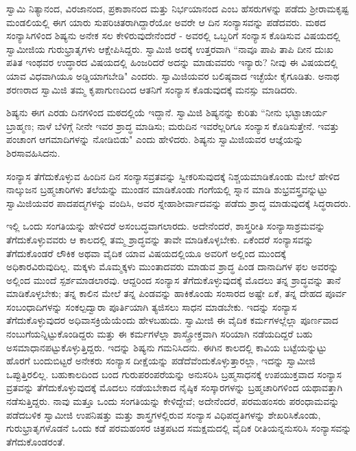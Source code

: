 ಸ್ವಾಮಿ ನಿತ್ಯಾನಂದ, ವಿರಜಾನಂದ, ಪ್ರಕಾಶಾನಂದ ಮತ್ತು ನಿರ್ಭಯಾನಂದ ಎಂಬ ಹೆಸರುಗಳನ್ನು ಪಡೆದು ಶ‍್ರೀರಾಮಕೃಷ್ಟ ಮಂಡಲಿಯಲ್ಲಿ ಈಗ ಯಾರು ಸುಪರಿಚಿತರಾಗಿದ್ದಾರೆಯೋ ಅವರೇ ಆ ದಿನ ಸಂನ್ಯಾಸವನ್ನು ಪಡೆದವರು. ಮಠದ ಸಂನ್ಯಾಸಿಗಳಿಂದ ಶಿಷ್ಯನು ಅನೇಕ ಸಲ ಕೇಳಿರುವುದೇನೆಂದರೆ - ಅವರಲ್ಲಿ ಒಬ್ಬರಿಗೆ ಸಂನ್ಯಾಸ ಕೊಡಿಸುವ ವಿಷಯದಲ್ಲಿ ಸ್ವಾಮೀಜಿಯ ಗುರುಭ್ರಾತೃಗಳು ಆಕ್ಷೇಪಿಸಿದ್ದರು. ಸ್ವಾಮಿಜಿ ಅದಕ್ಕೆ ಉತ್ತರವಾಗಿ “ನಾವೂ ಪಾಪಿ ತಾಪಿ ದೀನ ದುಃಖ ಪತಿತ ಇಂಥವರ ಉದ್ಧಾರದ ವಿಷಯದಲ್ಲಿ ಹಿಂಜರಿದರೆ ಅದನ್ನು ಮಾಡುವವರು ಇನ್ಯಾರು? ನೀವು ಈ ವಿಷಯದಲ್ಲಿ ಯಾವ ವಿಧವಾಗಿಯೂ ಅಡ್ಡಿಯಾಗಬೇಡಿ" ಎಂದರು. ಸ್ವಾಮಿಜಿಯವರ ಬಲಿಷ್ಠವಾದ ಇಚ್ಛೆಯೇ ಕೈಗೂಡಿತು. ಅನಾಥ ಶರಣರಾದ ಸ್ವಾಮಿಜಿ ತಮ್ಮ ಕೃಪಾಗುಣದಿಂದ ಆತನಿಗೆ ಸಂನ್ಯಾಸ ಕೊಡುವುದಕ್ಕೆ ಮನಸ್ಸು ಮಾಡಿದರು.

ಶಿಷ್ಯನು ಈಗ ಎರಡು ದಿನಗಳಿಂದ ಮಠದಲ್ಲಿಯೆ ಇದ್ದಾನೆ. ಸ್ವಾಮಿಜಿ ಶಿಷ್ಯನನ್ನು ಕುರಿತು “ನೀನು ಭಟ್ಟಾಚಾರ್ಯ ಬ್ರಾಹ್ಮಣ; ನಾಳೆ ಬೆಳಿಗ್ಗೆ ನೀನೇ ಇವರ ಶ್ರಾದ್ಧ ಮಾಡಿಸು; ಮರುದಿನ ಇವರೆಲ್ಲರಿಗೂ ಸಂನ್ಯಾಸ ಕೊಡಿಸುತ್ತೇನೆ. ಇವತ್ತು ಪಂಚಾಂಗ ಆಗಮಾದಿಗಳನ್ನು ನೋಡಿಬಿಡು" ಎಂದು ಹೇಳಿದರು. ಶಿಷ್ಯನು ಸ್ವಾಮಿಜಿಯವರ ಆಜ್ಞೆಯನ್ನು ಶಿರಸಾವಹಿಸಿದನು.

ಸಂನ್ಯಾಸ ತೆಗೆದುಕೊಳ್ಳುವ ಹಿಂದಿನ ದಿನ ಸಂನ್ಯಾಸವ್ರತವನ್ನು ಸ್ವೀಕರಿಸುವುದಕ್ಕೆ ನಿಶ್ಚಯಮಾಡಿಕೊಂಡು ಮೇಲೆ ಹೇಳಿದ ನಾಲ್ಕುಜನ ಬ್ರಹ್ಮಚಾರಿಗಳು ತಲೆಯನ್ನು ಮುಂಡನ ಮಾಡಿಕೊಂಡು ಗಂಗೆಯಲ್ಲಿ ಸ್ನಾನ ಮಾಡಿ ಶುಭ್ರವಸ್ತ್ರವನ್ನುಟ್ಟು ಸ್ವಾಮಿಜಿಯವರ ಪಾದಪದ್ಮಗಳನ್ನು ವಂದಿಸಿ, ಅವರ ಸ್ನೇಹಾಶೀರ್ವಾದವನ್ನು ಪಡೆದು ಶ್ರಾದ್ಧ ಮಾಡುವುದಕ್ಕೆ ಸಿದ್ಧರಾದರು.

ಇಲ್ಲಿ ಒಂದು ಸಂಗತಿಯನ್ನು ಹೇಳಿದರೆ ಅಸಂಬದ್ಧವಾಗಲಾರದು. ಅದೇನೆಂದರೆ, ಶಾಸ್ತ್ರರೀತಿ ಸಂನ್ಯಾಸಾಶ್ರಮವನ್ನು ತೆಗೆದುಕೊಳ್ಳುವವರು ಆ ಕಾಲದಲ್ಲಿ ತಮ್ಮ ಶ್ರಾದ್ಧವನ್ನು ತಾವೇ ಮಾಡಿಕೊಳ್ಳಬೇಕು. ಏಕೆಂದರೆ ಸಂನ್ಯಾಸವನ್ನು ತೆಗೆದುಕೊಂಡರೆ ಲೌಕಿಕ ಅಥವಾ ವೈದಿಕ ಯಾವ ವಿಷಯದಲ್ಲಿಯೂ ಅವರಿಗೆ ಅಲ್ಲಿಂದ ಮುಂದಕ್ಕೆ ಅಧಿಕಾರವಿರುವುದಿಲ್ಲ. ಮಕ್ಕಳು ಮೊಮ್ಮಕ್ಕಳು ಮುಂತಾದವರು ಮಾಡುವ ಶ್ರಾದ್ಧ ಪಿಂಡ ದಾನಾದಿಗಳ ಫಲ ಅವರನ್ನು ಅಲ್ಲಿಂದ ಮುಂದೆ ಸ್ಪರ್ಶಮಾಡಲಾರವು. ಆದ್ದರಿಂದ ಸಂನ್ಯಾಸ ತೆಗೆದುಕೊಳ್ಳುವುದಕ್ಕೆ ಮೊದಲು ತನ್ನ ಶ್ರಾದ್ಧವನ್ನು ತಾನೆ ಮಾಡಿಕೊಳ್ಳಬೇಕು; ತನ್ನ ಕಾಲಿನ ಮೇಲೆ ತನ್ನ ಪಿಂಡವನ್ನು ಹಾಕಿಕೊಂಡು ಸಂಸಾರದ ಅಷ್ಟೇ ಏಕೆ, ತನ್ನ ದೇಹದ ಪೂರ್ವ ಸಂಬಂಧಾದಿಗಳನ್ನು ಸಂಕಲ್ಪದ್ವಾರಾ ಪೂರ್ತಿಯಾಗಿ ತ್ಯಜಿಸಲು ಸಾಧನ ಮಾಡಬೇಕು. ಇದನ್ನು ಸಂನ್ಯಾಸ ತೆಗೆದುಕೊಳ್ಳುವುದರ ಅಧಿವಾಸಕ್ರಿಯೆಯೆಂದು ಹೇಳಬಹುದು. ಸ್ವಾಮೀಜಿ ಈ ವೈದಿಕ ಕರ್ಮಗಳಲ್ಲೆಲ್ಲಾ ಪೂರ್ಣವಾದ ನಂಬುಗೆಯನ್ನಿಟ್ಟುಕೊಂಡಿದ್ದರು ಮತ್ತು ಈ ಕರ್ಮಗಳೆಲ್ಲಾ ಶಾಸ್ತ್ರೋಕ್ತವಾಗಿ ಸರಿಯಾಗಿ ನಡೆಯದಿದ್ದರೆ ಬಹು ಅಸಮಾಧಾನಪಟ್ಟುಕೊಳ್ಳುತ್ತಿದ್ದರು. ಇದನ್ನು ಶಿಷ್ಯನು ಗಮನಿಸಿದನು. ಈಗಿನ ಕಾಲದಲ್ಲಿ ಕಾವಿಯ ಬಟ್ಟೆಯನ್ನುಟ್ಟು ಹೊರಗೆ ಬಂದುಬಿಟ್ಟರೆ ಅನೇಕರು ಸಂನ್ಯಾಸ ದೀಕ್ಷೆಯನ್ನು ಪಡೆದೆವೆಂದುಕೊಳ್ಳುತ್ತಾರಲ್ಲಾ, ಇದನ್ನು ಸ್ವಾಮೀಜಿ ಒಪ್ಪುತ್ತಿರಲಿಲ್ಲ. ಬಹುಕಾಲದಿಂದ ಬಂದ ಗುರುಪರಂಪರೆಯನ್ನು ಅನುಸರಿಸಿ ಬ್ರಹ್ಮಸಾಧನಕ್ಕೆ ಉಪಯುಕ್ತವಾದ ಸಂನ್ಯಾಸ ವ್ರತವನ್ನು ತೆಗೆದುಕೊಳ್ಳುವುದಕ್ಕೆ ಮೊದಲು ನಡೆಯಬೇಕಾದ ನೈಷ್ಠಿಕ ಸಂಸ್ಕಾರಗಳನ್ನು ಬ್ರಹ್ಮಚಾರಿಗಳಿಂದ ಯಥಾವತ್ತಾಗಿ ನಡೆಸುತ್ತಿದ್ದರು. ನಾವು ಮತ್ತೂ ಒಂದು ಸಂಗತಿಯನ್ನು ಕೇಳಿದ್ದೇವೆ; ಅದೇನೆಂದರೆ, ಪರಮಹಂಸರು ಪರಂಧಾಮವನ್ನು ಪಡೆದಬಳಿಕ ಸ್ವಾಮೀಜಿ ಉಪನಿಷತ್ತು ಮತ್ತು ಶಾಸ್ತ್ರಗಳಲ್ಲಿರುವ ಸಂನ್ಯಾಸ ವಿಧಿಪದ್ಧತಿಗಳನ್ನು ಶೇಖರಿಸಿಕೊಂಡು, ಗುರುಭ್ರಾತೃಗಳೊಡನೆ ಒಂದು ಕಡೆ ಪರಮಹಂಸರ ಚಿತ್ರಪಟದ ಸಮಕ್ಷಮದಲ್ಲಿ ವೈದಿಕ ರೀತಿಯನ್ನನುಸರಿಸಿ ಸಂನ್ಯಾಸವನ್ನು ತೆಗೆದುಕೊಂಡರಂತೆ.

